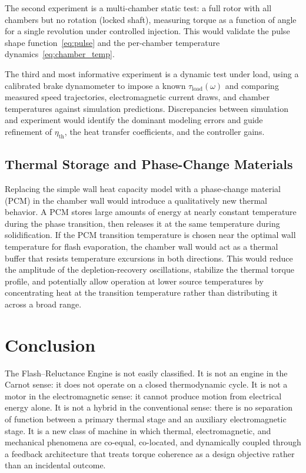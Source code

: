 \documentclass[11pt, a4paper]{article}
\theoremstyle{plain}
\theoremstyle{definition}
\newcommand{\tauload}{\tau_{\mathrm{load}}}
\newcommand{\om}{\omega}
\begin{document}
The second experiment is a multi-chamber static test: a full rotor with all chambers but no rotation (locked shaft), measuring torque as a function of angle for a single revolution under controlled injection. This would validate the pulse shape function~\eqref{eq:pulse} and the per-chamber temperature dynamics~\eqref{eq:chamber_temp}.

The third and most informative experiment is a dynamic test under load, using a calibrated brake dynamometer to impose a known $\tauload(\om)$ and comparing measured speed trajectories, electromagnetic current draws, and chamber temperatures against simulation predictions. Discrepancies between simulation and experiment would identify the dominant modeling errors and guide refinement of $\eta_{\mathrm{th}}$, the heat transfer coefficients, and the controller gains.

\subsection{Thermal Storage and Phase-Change Materials}

Replacing the simple wall heat capacity model with a phase-change material (PCM) in the chamber wall would introduce a qualitatively new thermal behavior. A PCM stores large amounts of energy at nearly constant temperature during the phase transition, then releases it at the same temperature during solidification. If the PCM transition temperature is chosen near the optimal wall temperature for flash evaporation, the chamber wall would act as a thermal buffer that resists temperature excursions in both directions. This would reduce the amplitude of the depletion-recovery oscillations, stabilize the thermal torque profile, and potentially allow operation at lower source temperatures by concentrating heat at the transition temperature rather than distributing it across a broad range.

\section{Conclusion}
\label{sec:conclusion}

The Flash--Reluctance Engine is not easily classified. It is not an engine in the Carnot sense: it does not operate on a closed thermodynamic cycle. It is not a motor in the electromagnetic sense: it cannot produce motion from electrical energy alone. It is not a hybrid in the conventional sense: there is no separation of function between a primary thermal stage and an auxiliary electromagnetic stage. It is a new class of machine in which thermal, electromagnetic, and mechanical phenomena are co-equal, co-located, and dynamically coupled through a feedback architecture that treats torque coherence as a design objective rather than an incidental outcome.
\end{document}

